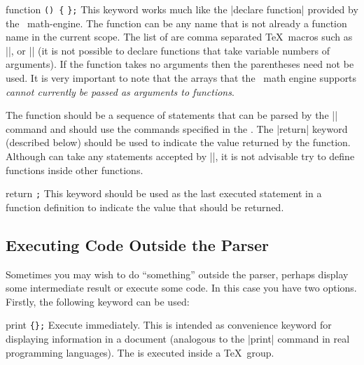 \begin{math-keyword}{{function} \texttt{(}\texttt{) \{}  \texttt{\};}}
    This keyword works much like the |declare function| provided by the
    \pgfname\ math-engine. The function  can be any name that is not
    already a function name in the current scope. The list of 
    are comma separated \TeX\ macros such as |\x|, or |\y| (it is not possible
    to declare functions that take variable numbers of arguments). If the
    function takes no arguments then the parentheses need not be used. It is
    very important to note that the arrays that the \pgfname\ math engine
    supports \emph{cannot currently be passed as arguments to functions}.

    The function  should be a sequence of statements that can
    be parsed by the |\tikzmath| command and should use the commands specified
    in the . The |return| keyword (described below) should be
    used to indicate the value returned by the function.
    Although  can take any statements accepted by |\tikzmath|,
    it is not advisable try to define functions inside other functions.
\begin{codeexample}[pre={\pgfmathsetseed{1}},preamble={\usetikzlibrary{math}}]
\end{codeexample}
\end{math-keyword}

\begin{math-keyword}{{return} \texttt{;}}
    This keyword should be used as the last executed statement in a function
    definition to indicate the value that should be returned.
\end{math-keyword}


\subsection{Executing Code Outside the Parser}

Sometimes you may wish to do ``something'' outside the parser, perhaps display
some intermediate result or execute some code. In this case you have two
options. Firstly, the following keyword can be used:

\begin{math-keyword}{{print} \texttt{\{}\texttt{\};}}
    Execute  immediately. This is intended as convenience keyword
    for displaying information in a document (analogous to the |print| command
    in real programming languages). The  is executed inside a \TeX\
    group.
\begin{codeexample}[pre={\pgfmathsetseed{1}},preamble={\usetikzlibrary{math}}]
\end{codeexample}
\end{math-keyword}

